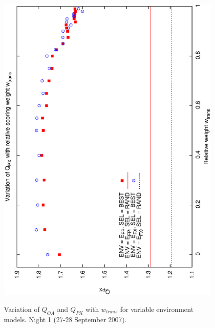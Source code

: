 \begin{figure}[h]
\begin{center}
{    \includegraphics[scale=0.5, angle=-90]{figures/cs1_dw1a2_px.eps}
    \label{fig:cs1_dw1a2_px}
  }
 \caption{Variation of $Q_{OA}$ and $Q_{PX}$ with $w_{trans}$  for variable environment models.  Night 1 (27-28 September 2007).}
\end{center}
\end{figure}


